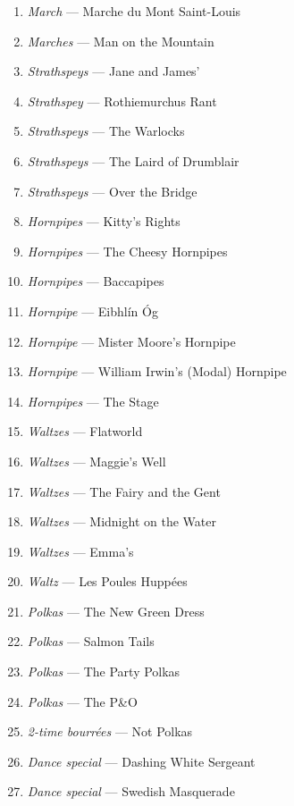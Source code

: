 \documentclass[11pt]{article}
\begin{document}
\begin{multicols*}{2}
\begin{enumerate}
        \item[] \textit{March} --- Marche du Mont Saint-Louis
        \item[] \textit{Marches} --- Man on the Mountain
        \item[] \textit{Strathspeys} --- Jane and James'
        \item[] \textit{Strathspey} --- Rothiemurchus Rant
        \item[] \textit{Strathspeys} --- The Warlocks
        \item[] \textit{Strathspeys} --- The Laird of Drumblair
        \item[] \textit{Strathspeys} --- Over the Bridge
        \item[] \textit{Hornpipes} --- Kitty's Rights
        \item[] \textit{Hornpipes} --- The Cheesy Hornpipes
        \item[] \textit{Hornpipes} --- Baccapipes
        \item[] \textit{Hornpipe} --- Eibhl\'in \'Og
        \item[] \textit{Hornpipe} --- Mister Moore's Hornpipe
        \item[] \textit{Hornpipe} --- William Irwin's (Modal) Hornpipe
        \item[] \textit{Hornpipes} --- The Stage
        \item[] \textit{Waltzes} --- Flatworld
        \item[] \textit{Waltzes} --- Maggie's Well
        \item[] \textit{Waltzes} --- The Fairy and the Gent
        \item[] \textit{Waltzes} --- Midnight on the Water
        \item[] \textit{Waltzes} --- Emma's
        \item[] \textit{Waltz} --- Les Poules Hupp\'ees
        \item[] \textit{Polkas} --- The New Green Dress
        \item[] \textit{Polkas} --- Salmon Tails
        \item[] \textit{Polkas} --- The Party Polkas
        \item[] \textit{Polkas} --- The P\&O
        \item[] \textit{2-time bourr\'ees} --- Not Polkas
        \item[] \textit{Dance special} --- Dashing White Sergeant
        \item[] \textit{Dance special} --- Swedish Masquerade
    \end{enumerate}
\end{multicols*}
\clearpage
\end{document}
